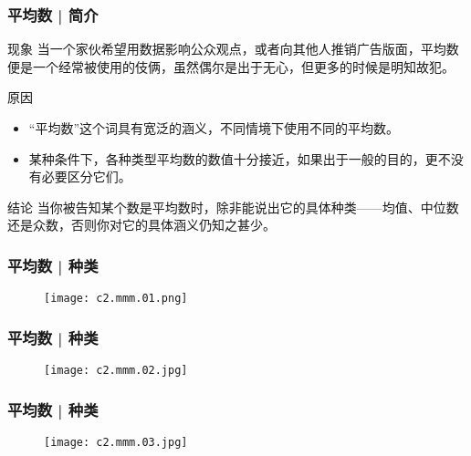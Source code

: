 \begin{frame}
  \frametitle{平均数 | 简介}
  \begin{block}{现象}
    当一个家伙希望用数据影响公众观点，或者向其他人推销广告版面，平均数便是一个经常被使用的伎俩，虽然偶尔是出于无心，但更多的时候是明知故犯。
  \end{block}
  \pause
  \begin{block}{原因}
    \begin{itemize}
      \item “平均数”这个词具有宽泛的涵义，不同情境下使用不同的平均数。
      \item 某种条件下，各种类型平均数的数值十分接近，如果出于一般的目的，更不没有必要区分它们。
    \end{itemize}
  \end{block}
  \pause
  \begin{block}{结论}
    当你被告知某个数是平均数时，除非能说出它的具体种类——均值、中位数还是众数，否则你对它的具体涵义仍知之甚少。
  \end{block}
\end{frame}

\begin{frame}
  \frametitle{平均数 | 种类}
  \begin{figure}
    \centering
    \texttt{[image: c2.mmm.01.png]}
  \end{figure}
\end{frame}

\begin{frame}
  \frametitle{平均数 | 种类}
  \begin{figure}
    \centering
    \texttt{[image: c2.mmm.02.jpg]}
  \end{figure}
\end{frame}

\begin{frame}
  \frametitle{平均数 | 种类}
  \begin{figure}
    \centering
    \texttt{[image: c2.mmm.03.jpg]}
  \end{figure}
\end{frame}

